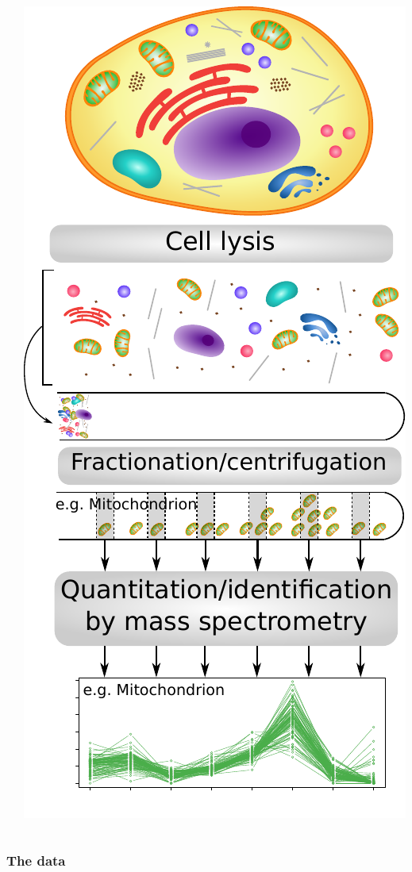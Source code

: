 \documentclass{beamer}
\theoremstyle{example}
\begin{document}
\begin{frame}{}
\begin{columns}
\begin{column}{0.5\textwidth}
    \end{column}
    \begin{column}{0.5\textwidth}
      \includegraphics[width=.78\linewidth]{figs/workflow_primary.pdf}
    \end{column}
  \end{columns}

\end{frame}

\subsubsection*{The data}
\label{sec:data}
\end{document}
